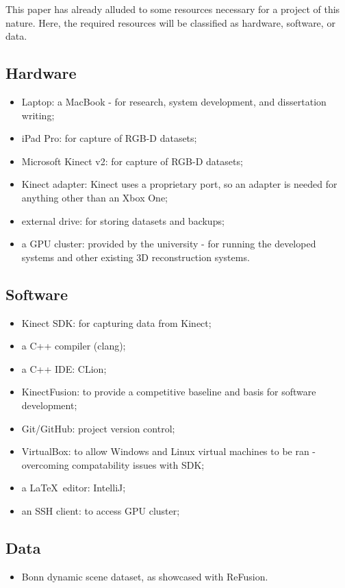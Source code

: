 This paper has already alluded to some resources necessary for a project of this nature.
Here, the required resources will be classified as hardware, software, or data.

\subsection{Hardware}\label{subsec:hardware}
\begin{itemize}
	\item Laptop: a MacBook - for research, system development, and dissertation writing;
	\item iPad Pro: for capture of RGB-D datasets;
	\item Microsoft Kinect v2: for capture of RGB-D datasets;
	\item Kinect adapter: Kinect uses a proprietary port, so an adapter is needed for anything other than an Xbox One;
	\item external drive: for storing datasets and backups;
	\item a GPU cluster: provided by the university - for running the developed systems and other existing 3D reconstruction systems.
\end{itemize}

\subsection{Software}\label{subsec:software}
\begin{itemize}
	\item Kinect SDK: for capturing data from Kinect;
	\item a C++ compiler (clang);
	\item a C++ IDE: CLion;
	\item KinectFusion: to provide a competitive baseline and basis for software development;
	\item Git/GitHub: project version control;
	\item VirtualBox: to allow Windows and Linux virtual machines to be ran - overcoming compatability issues with SDK;
	\item a \LaTeX\ editor: IntelliJ;
	\item an SSH client: to access GPU cluster;
\end{itemize}

\subsection{Data}\label{subsec:data}
\begin{itemize}
	\item Bonn dynamic scene dataset, as showcased with ReFusion\cite{palazzolo2019iros}.
\end{itemize}
